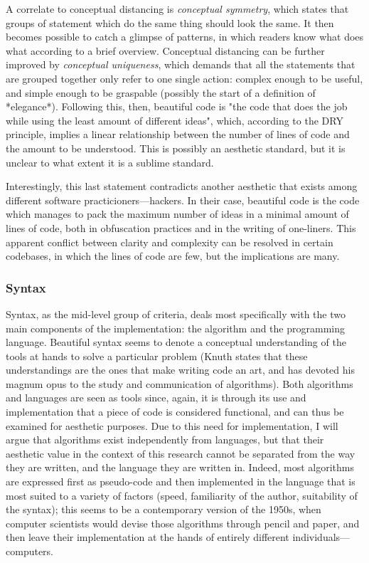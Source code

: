 A correlate to conceptual distancing is \emph{conceptual symmetry}, which states that groups of statement which do the same thing should look the same. It then becomes possible to catch a glimpse of patterns, in which readers know what does what according to a brief overview. Conceptual distancing can be further improved by \emph{conceptual uniqueness}, which demands that all the statements that are grouped together only refer to one single action: complex enough to be useful, and simple enough to be graspable (possibly the start of a definition of *elegance*). Following this, then, beautiful code is "the code that does the job while using the least amount of different ideas", which, according to the DRY principle, implies a linear relationship between the number of lines of code and the amount to be understood. This is possibly an aesthetic standard, but it is unclear to what extent it is a sublime standard.

Interestingly, this last statement contradicts another aesthetic that exists among different software practicioners—hackers. In their case, beautiful code is the code which manages to pack the maximum number of ideas in a minimal amount of lines of code, both in obfuscation practices and in the writing of one-liners. This apparent conflict between clarity and complexity can be resolved in certain codebases, in which the lines of code are few, but the implications are many.

\subsubsection{Syntax}
\label{subsubsec:framework-syntax}

Syntax, as the mid-level group of criteria, deals most specifically with the two main components of the implementation: the algorithm and the programming language. Beautiful syntax seems to denote a conceptual understanding of the tools at hands to solve a particular problem (Knuth states that these understandings are the ones that make writing code an art, and has devoted his magnum opus to the study and communication of algorithms). Both algorithms and languages are seen as tools since, again, it is through its use and implementation that a piece of code is considered functional, and can thus be examined for aesthetic purposes. Due to this need for implementation, I will argue that algorithms exist independently from languages, but that their aesthetic value in the context of this research cannot be separated from the way they are written, and the language they are written in. Indeed, most algorithms are expressed first as pseudo-code and then implemented in the language that is most suited to a variety of factors (speed, familiarity of the author, suitability of the syntax); this seems to be a contemporary version of the 1950s, when computer scientists would devise those algorithms through pencil and paper, and then leave their implementation at the hands of entirely different individuals—computers.

